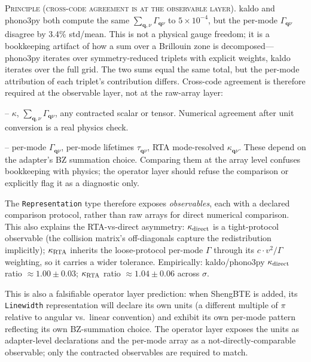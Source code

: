 \documentclass[11pt,a4paper]{article}
\begin{document}
\medskip
\noindent\textsc{Principle (cross-code agreement is at the observable layer).} kaldo and
phono3py both compute the same $\sum_{\mathbf{q},\nu}\Gamma_{\mathbf{q}\nu}$ to $5\times
10^{-4}$, but the per-mode $\Gamma_{\mathbf{q}\nu}$ disagree by 3.4\% std/mean. This is
not a physical gauge freedom; it is a bookkeeping artifact of how a sum over a Brillouin
zone is decomposed---phono3py iterates over symmetry-reduced triplets with explicit
weights, kaldo iterates over the full grid. The two sums equal the same total, but the
per-mode attribution of each triplet's contribution differs. Cross-code agreement is
therefore required at the observable layer, not at the raw-array layer:
\begin{description}[leftmargin=2em, itemsep=0.4em]
  \item[Tight comparison protocol] -- $\kappa$, $\sum_{\mathbf{q},\nu}\Gamma_{\mathbf{q}\nu}$,
        any contracted scalar or tensor. Numerical agreement after unit conversion is a
        real physics check.
  \item[Not directly comparable] -- per-mode $\Gamma_{\mathbf{q}\nu}$, per-mode lifetimes
        $\tau_{\mathbf{q}\nu}$, RTA mode-resolved $\kappa_{\mathbf{q}\nu}$. These depend on
        the adapter's BZ summation choice. Comparing them at the array level confuses
        bookkeeping with physics; the operator layer should refuse the comparison or explicitly
        flag it as a diagnostic only.
\end{description}
The \texttt{Representation} type therefore exposes \emph{observables}, each with a
declared comparison protocol, rather than raw arrays for direct numerical comparison. This
also explains the RTA-vs-direct asymmetry: $\kappa_{\rm direct}$ is a tight-protocol
observable (the collision matrix's off-diagonals capture the redistribution implicitly);
$\kappa_{\rm RTA}$ inherits the loose-protocol per-mode $\Gamma$ through its
$c \cdot v^2 / \Gamma$ weighting, so it carries a wider tolerance. Empirically:
kaldo/phono3py $\kappa_{\rm direct}$ ratio $\approx 1.00 \pm 0.03$; $\kappa_{\rm RTA}$
ratio $\approx 1.04 \pm 0.06$ across $\sigma$.

\medskip
This is also a falsifiable operator layer prediction: when ShengBTE is added, its
\texttt{Linewidth} representation will declare its own units (a different multiple of
$\pi$ relative to angular vs.\ linear convention) and exhibit its own per-mode pattern
reflecting its own BZ-summation choice. The operator layer exposes the units as adapter-level
declarations and the per-mode array as a not-directly-comparable observable; only the
contracted observables are required to match.
\end{document}
